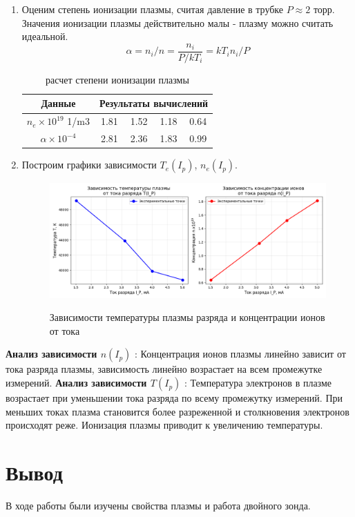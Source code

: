 \documentclass[a4paper, 12pt]{article}
\begin{document}
\begin{enumerate}
    \item Оценим степень ионизации плазмы, считая давление в трубке $P \approx 2$ торр.
    Значения ионизации плазмы действительно малы - плазму можно считать идеальной.
    \begin{equation*}
        \alpha = n_{i} / n = \frac{n_{i} }{P/kT_{i}} = kT_{i}n_{i}/P
    \end{equation*}
    \begin{table}[H]
        \centering
        \begin{tabular}{|c|c|c|c|c|}
            \hline
            Данные & \multicolumn{4}{|c|}{Результаты вычислений}\\
            \hline
            $n_{e}\times 10^{19}$ 1/m3 & 1.81 & 1.52 & 1.18 & 0.64\\
            $\alpha \times 10^{-4}$ & 2.81 & 2.36 & 1.83 & 0.99\\
            \hline
        \end{tabular}
        \caption{расчет степени ионизации плазмы}
        \label{расчет степени ионизации плазмы}
    \end{table}
    \item Построим графики зависимости $T_{e}(I_{p})$, $n_{e}(I_{p})$.
    \begin{figure}[H]
        \centering
        \includegraphics[width=1.0\linewidth]{last.png}
        \label{графики зависимости температуры и концентрации от тока разряда}
        \caption{Зависимости температуры плазмы разряда и концентрации ионов от тока}
    \end{figure}
\end{enumerate}
\textbf{Анализ зависимости $n(I_p)$} : Концентрация ионов плазмы линейно зависит от тока разряда плазмы, зависимость линейно возрастает
на всем промежутке измерений. \newline
\textbf{Анализ зависимости $T(I_p)$} : Температура электронов в плазме возрастает при уменьшении тока разряда по всему промежутку измерений. При меньших токах плазма
становится более разреженной и столкновения электронов происходят реже. Ионизация плазмы приводит к увеличению температуры.
\section*{Вывод}
В ходе работы были изучены свойства плазмы и работа двойного зонда.
\end{document}
